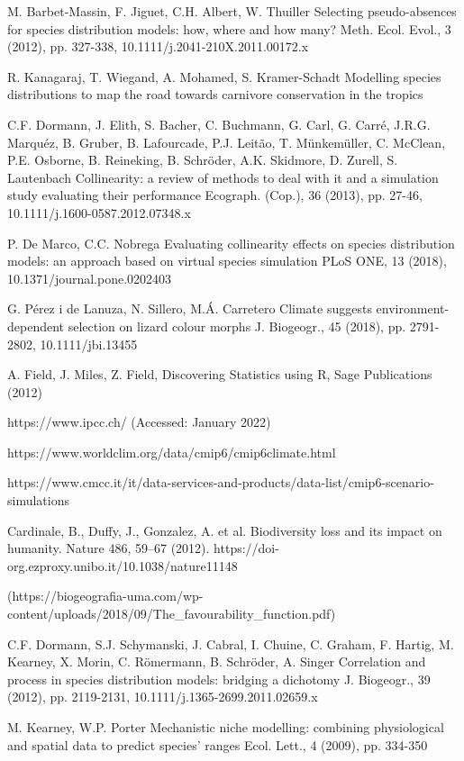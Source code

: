 \documentclass[12pt,a4paper]{article}
\begin{document}
\begin{thebibliography}{999}
M. Barbet-Massin, F. Jiguet, C.H. Albert, W. Thuiller
Selecting pseudo-absences for species distribution models: how, where and how many?
Meth. Ecol. Evol., 3 (2012), pp. 327-338, 10.1111/j.2041-210X.2011.00172.x

R. Kanagaraj, T. Wiegand, A. Mohamed, S. Kramer-Schadt
Modelling species distributions to map the road towards carnivore conservation in the tropics

C.F. Dormann, J. Elith, S. Bacher, C. Buchmann, G. Carl, G. Carré, J.R.G. Marquéz, B. Gruber, B. Lafourcade, P.J. Leitão, T. Münkemüller, C. McClean, P.E. Osborne, B. Reineking, B. Schröder, A.K. Skidmore, D. Zurell, S. Lautenbach
Collinearity: a review of methods to deal with it and a simulation study evaluating their performance
Ecograph. (Cop.), 36 (2013), pp. 27-46, 10.1111/j.1600-0587.2012.07348.x

P. De Marco, C.C. Nobrega
Evaluating collinearity effects on species distribution models: an approach based on virtual species simulation
PLoS ONE, 13 (2018), 10.1371/journal.pone.0202403

G. Pérez i de Lanuza, N. Sillero, M.Á. Carretero
Climate suggests environment-dependent selection on lizard colour morphs
J. Biogeogr., 45 (2018), pp. 2791-2802, 10.1111/jbi.13455

A. Field, J. Miles, Z. Field, Discovering Statistics using R, Sage Publications (2012)

https://www.ipcc.ch/ (Accessed: January 2022)

https://www.worldclim.org/data/cmip6/cmip6climate.html

https://www.cmcc.it/it/data-services-and-products/data-list/cmip6-scenario-simulations

Cardinale, B., Duffy, J., Gonzalez, A. et al. Biodiversity loss and its impact on humanity. Nature 486, 59–67 (2012). https://doi-org.ezproxy.unibo.it/10.1038/nature11148

(https://biogeografia-uma.com/wp-content/uploads/2018/09/The\_favourability\_function.pdf)

C.F. Dormann, S.J. Schymanski, J. Cabral, I. Chuine, C. Graham, F. Hartig, M. Kearney, X. Morin, C. Römermann, B. Schröder, A. Singer
Correlation and process in species distribution models: bridging a dichotomy
J. Biogeogr., 39 (2012), pp. 2119-2131, 10.1111/j.1365-2699.2011.02659.x


M. Kearney, W.P. Porter
Mechanistic niche modelling: combining physiological and spatial data to predict species’ ranges
Ecol. Lett., 4 (2009), pp. 334-350



\end{thebibliography}
\end{document}
